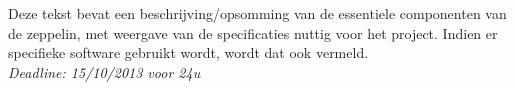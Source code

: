 \documentclass{peno-opdracht2}
\begin{document}
\maketitle

Deze tekst bevat een beschrijving/opsomming van de essentiele componenten van de zeppelin, met weergave van de specificaties nuttig voor het project. Indien er specifieke software gebruikt wordt, wordt dat ook vermeld.\\

\emph{Deadline: 15/10/2013 voor 24u}
\end{document}
